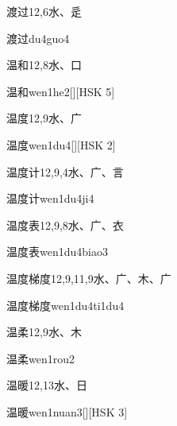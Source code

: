 \begin{entry}{渡过}{12,6}{⽔、⾡}
  \begin{phonetics}{渡过}{du4guo4}
  \end{phonetics}
\end{entry}

\begin{entry}{温和}{12,8}{⽔、⼝}
  \begin{phonetics}{温和}{wen1he2}[][HSK 5]
  \end{phonetics}
\end{entry}

\begin{entry}{温度}{12,9}{⽔、⼴}
  \begin{phonetics}{温度}{wen1du4}[][HSK 2]
  \end{phonetics}
\end{entry}

\begin{entry}{温度计}{12,9,4}{⽔、⼴、⾔}
  \begin{phonetics}{温度计}{wen1du4ji4}
  \end{phonetics}
\end{entry}

\begin{entry}{温度表}{12,9,8}{⽔、⼴、⾐}
  \begin{phonetics}{温度表}{wen1du4biao3}
  \end{phonetics}
\end{entry}

\begin{entry}{温度梯度}{12,9,11,9}{⽔、⼴、⽊、⼴}
  \begin{phonetics}{温度梯度}{wen1du4ti1du4}
  \end{phonetics}
\end{entry}

\begin{entry}{温柔}{12,9}{⽔、⽊}
  \begin{phonetics}{温柔}{wen1rou2}
  \end{phonetics}
\end{entry}

\begin{entry}{温暖}{12,13}{⽔、⽇}
  \begin{phonetics}{温暖}{wen1nuan3}[][HSK 3]
  \end{phonetics}
\end{entry}

